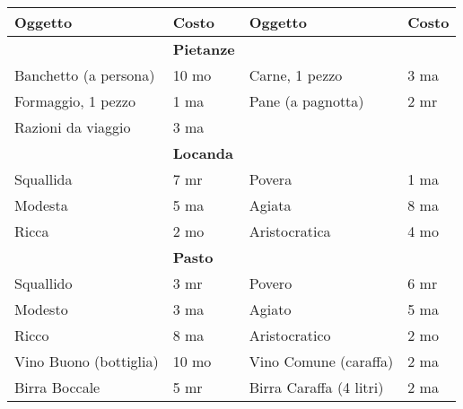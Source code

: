 \documentclass[landscape,10pt,a4paper]{article}
\begin{document}
\pagebreak

\begin{multicols}{2}
	
	\begin{dmbox}[title=Oggetti e Viveri]
		
		\noindent\begin{tabular}{ll|ll}
			\textbf{Oggetto}&\textbf{Costo}&\textbf{Oggetto}&\textbf{Costo}\\
			\hline
			&\textbf{Pietanze} &&\\
			Banchetto (a persona)&10 mo&Carne, 1 pezzo&3 ma\\
			Formaggio, 1 pezzo&1 ma&Pane (a pagnotta)&2 mr\\
			Razioni da viaggio& 3 ma &&\\
			\hline
			&\textbf{Locanda}&&\\
			Squallida&7 mr&	Povera&1 ma\\
			Modesta&5 ma&Agiata&8 ma\\
			Ricca&2 mo&	Aristocratica&4 mo\\
			\hline
			&\textbf{Pasto}&&\\
			Squallido&3 mr	&	Povero			&6 mr\\
			Modesto&3 ma	&	Agiato			&5 ma\\
			Ricco&8 ma		&	Aristocratico	&2 mo\\
			Vino Buono (bottiglia)&10 mo& Vino	Comune (caraffa)&2 ma\\
			Birra Boccale&5 mr&Birra Caraffa (4 litri)&2 ma\\
		\end{tabular}		
		\end{dmbox}


\end{multicols}
\end{document}
